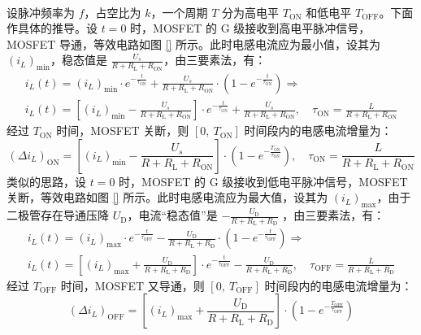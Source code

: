 \documentclass[UTF8]{report}
\theoremstyle{MyLineTheoremStyle} %
\theoremstyle{MyBlockTheoremStyle} %
\theoremstyle{MySubsubsectionStyle} %
\begin{document}
~\\
设脉冲频率为 $f$，占空比为 $k$，一个周期 $T$ 分为高电平 $T_{\text{ON}}$ 和低电平 $T_{\text{OFF}}$。下面作具体的推导。设 $t = 0$ 时，MOSFET 的 G 级接收到高电平脉冲信号，MOSFET 导通，等效电路如图 \ref{} 所示。此时电感电流应为最小值，设其为 $\left(i_L\right)_{\min}$，稳态值是 $ \frac{U_s}{R + R_{\text{L}} + R_{\text{ON}}}$，由三要素法，有：
\begin{gather}
i_L(t) = \left(i_L\right)_{\min}\cdot e^{-\frac{t}{\tau_{\text{ON}}}} + \frac{U_s}{R + R_{\text{L}} + R_{\text{ON}}}\cdot\left(1 - e^{-\frac{t}{\tau_{\text{ON}}}}\right) \Longrightarrow \\ 
i_L(t) = \left[ \left(i_L\right)_{\min} - \frac{U_s}{R + R_{\text{L}} + R_{\text{ON}}} \right]\cdot e^{-\frac{t}{\tau_{\text{ON}}}} + \frac{U_s}{R + R_{\text{L}} + R_{\text{ON}}},\quad \tau_{\text{ON}} = \frac{L}{R + R_{\text{L}} + R_{\text{ON}}}
\end{gather}
经过 $T_{\text{ON}}$ 时间，MOSFET 关断，则 $[0,\  T_{\text{ON}}]$ 时间段内的电感电流增量为：
\begin{equation}
\left(\Delta i_L\right)_{\text{ON}} = \left[ \left(i_L\right)_{\min} - \frac{U_s}{R + R_{\text{L}} + R_{\text{ON}}} \right]\cdot \left(1 - e^{-\frac{T_{\text{ON}}}{\tau_{\text{ON}}}} \right) ,\quad
\tau_{\text{ON}} = \frac{L}{R + R_{\text{L}} + R_{\text{ON}}}
\end{equation}
类似的思路，设 $t = 0$ 时，MOSFET 的 G 级接收到低电平脉冲信号，MOSFET 关断，等效电路如图 \ref{} 所示。此时电感电流应为最大值，设其为 $\left(i_L\right)_{\max}$，由于二极管存在导通压降 $U_\text{D}$，电流“稳态值”是 $- \frac{U_\text{D}}{R + R_{\text{L}} + R_{\text{D}}}$ ，由三要素法，有：
\begin{gather}
    i_L(t) = \left(i_L\right)_{\max}\cdot e^{-\frac{t}{\tau_{\text{OFF}}}} - \frac{U_\text{D}}{R + R_{\text{L}} + R_{\text{D}}}\cdot\left(1 - e^{-\frac{t}{\tau_{\text{OFF}}}}\right) \Longrightarrow \\ 
    i_L(t) = \left[ \left(i_L\right)_{\max} + \frac{U_\text{D}}{R + R_{\text{L}} + R_{\text{D}}} \right]\cdot e^{-\frac{t}{\tau_{\text{OFF}}}} - \frac{U_\text{D}}{R + R_{\text{L}} + R_{\text{D}}},\quad \tau_{\text{OFF}} = \frac{L}{R + R_{\text{L}} + R_{\text{D}}}
\end{gather}
经过 $T_{\text{OFF}}$ 时间，MOSFET 又导通，则 $[0,\  T_{\text{OFF}}]$ 时间段内的电感电流增量为：
\begin{equation}
    \left(\Delta i_L\right)_{\text{OFF}} = \left[ \left(i_L\right)_{\max} + \frac{U_\text{D}}{R + R_{\text{L}} + R_{\text{D}}}\right]\cdot \left(1 - e^{-\frac{T_{\text{OFF}}}{\tau_{\text{OFF}}}} \right)
\end{equation}
\end{document}
